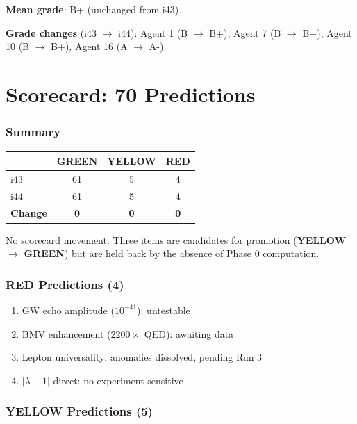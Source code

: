 \documentclass[11pt,a4paper]{article}
\newcommand{\GREEN}{\textcolor{dfdgreen}{\textbf{GREEN}}}
\newcommand{\YELLOW}{\textcolor{dfdyellow}{\textbf{YELLOW}}}
\newcommand{\RED}{\textcolor{dfdred}{\textbf{RED}}}
\begin{document}
\textbf{Mean grade}: B+ (unchanged from i43).

\textbf{Grade changes} (i43 $\to$ i44): Agent 1 (B $\to$ B+), Agent 7 (B $\to$ B+), Agent 10 (B $\to$ B+), Agent 16 (A $\to$ A-).


\part{Scorecard: 70 Predictions}

\section{Summary}

\begin{center}
\begin{tabular}{lccc}
\toprule
& \textbf{\GREEN} & \textbf{\YELLOW} & \textbf{\RED} \\
\midrule
i43 & 61 & 5 & 4 \\
i44 & 61 & 5 & 4 \\
\textbf{Change} & \textbf{0} & \textbf{0} & \textbf{0} \\
\bottomrule
\end{tabular}
\end{center}

No scorecard movement. Three items are candidates for promotion (\YELLOW{} $\to$ \GREEN) but are held back by the absence of Phase 0 computation.

\section{RED Predictions (4)}

\begin{enumerate}
\item GW echo amplitude ($10^{-41}$): untestable
\item BMV enhancement ($2200\times$ QED): awaiting data
\item Lepton universality: anomalies dissolved, pending Run 3
\item $|\lambda-1|$ direct: no experiment sensitive
\end{enumerate}

\section{YELLOW Predictions (5)}
\end{document}
